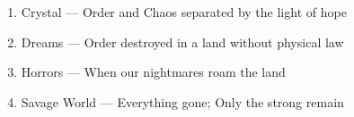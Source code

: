 \begin{enumerate}
\begin{enumerate}
		\begin{enumerate}
		\item Crystal --- Order and Chaos separated by the light of hope
		\item Dreams --- Order destroyed in a land without physical law
		\item Horrors --- When our nightmares roam the land
		\item Savage World --- Everything gone; Only the strong remain
		\end{enumerate}
	\end{enumerate}
\end{enumerate}

\appendix
